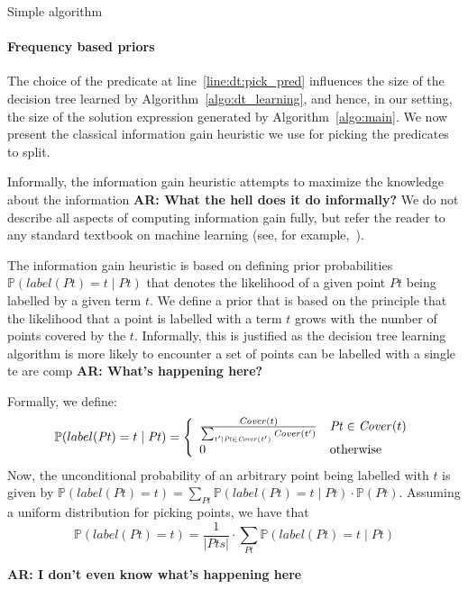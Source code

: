 \documentclass{llncs}
\newcommand\arsays[1]{{\bf AR: #1}}
\newcommand\Points{\mathit{Pts}}
\newcommand\Point{\mathit{Pt}}
\newcommand\Term{t}
\newcommand\Cover{\mathit{Cover}}
\newcommand\Prob[1]{\mathbb{P}(#1)}
\begin{document}
\begin{example}
  Simple algorithm
\end{example}

\paragraph{Frequency based priors}
The choice of the predicate at line~\ref{line:dt:pick_pred} influences
the size of the decision tree learned by
Algorithm~\ref{algo:dt_learning}, and hence, in our setting, the size of
the solution expression generated by Algorithm~\ref{algo:main}.
We now present the classical information gain heuristic we use for
picking the predicates to split.

Informally, the information gain heuristic attempts to maximize the
knowledge about the information \arsays{What the hell does it do
informally?}
We do not describe all aspects of computing information gain fully, but
refer the reader to any standard textbook on machine learning (see, for
example,~\cite{xxx}).

The information gain heuristic is based on defining prior
probabilities $\Prob{label(\Point) = \Term \mid \Point}$ that denotes
the likelihood of a given point $\Point$ being labelled by a given term
$\Term$.
We define a prior that is based on the principle that the likelihood
that a point is labelled with a term $\Term$ grows with the number of
points covered by the $\Term$.
Informally, this is justified as the decision tree learning algorithm is
more likely to encounter a set of points can be labelled with a single
te are comp \arsays{What's happening here?}

Formally, we define:
\[
    \Prob{label(\Point) = t \mid \Point} = \left\{
    \begin{array}{l l}
      \frac{\Cover(\Term)}{\sum_{\Term' | \Point \in \Cover(\Term')} \Cover(\Term') } & \Point \in \Cover(\Term) \\
        0  & \mbox{otherwise}
    \end{array} \right.
\]
Now, the unconditional probability of an arbitrary point being labelled
with $\Term$ is given by $\Prob{label(\Point) = \Term} = \sum_{\Point}
\Prob{label(\Point) = \Term \mid \Point}\cdot\Prob{\Point}$.
Assuming a uniform distribution for picking points, we have that
\[
    \Prob{label(\Point) = t} =  \frac{1}{\vert \Points \vert} \cdot \sum_{\Point} \Prob{label(\Point) = \Term \mid \Point}
\]

\arsays{I don't even know what's happening here}
\end{document}
